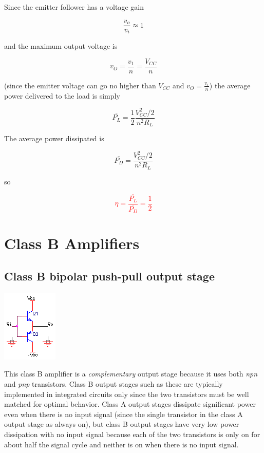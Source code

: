 Since the emitter follower has a voltage gain

\textcolor{red}{
\begin{equation}
\frac{v_o}{v_i} \approx 1
\end{equation}
}

and the maximum output voltage is

\begin{equation}
v_{O} = \frac{v_{1}}{n} = \frac{V_{CC}}{n}
\end{equation}

(since the emitter voltage can go no higher than $V_{CC}$ and $v_{O} = \frac{v_{1}}{n}$) the average power delivered to the load is simply

\begin{equation}
\overline{P_{L}} = \frac{1}{2}\frac{V_{CC}^{2}/2}{n^{2}R_{L}}
\end{equation}

The average power dissipated is

\begin{equation}
\overline{P_{D}} = \frac{V_{CC}^{2}/2}{n^{2}R_{L}}
\end{equation}

so \autocite[591]{microelectronics-neaman}

\textcolor{red}{
\begin{equation}
\eta = \frac{\overline{P_{L}}}{\overline{P_{D}}} = \frac{1}{2}
\end{equation}
}

\section{Class B Amplifiers}

\subsection{Class B bipolar push-pull output stage}
\begin{center}
	\includegraphics{schematics/classBoutput.PNG}
\end{center}
This class B amplifier is a \textit{complementary} output stage because it uses both \textit{npn} and \textit{pnp} transistors.
Class B output stages such as these are typically implemented in integrated circuits only since the two transistors must be well matched for optimal behavior.
Class A output stages dissipate significant power even when there is no input signal (since the single transistor in the class A output stage as always on), but class B output stages have very low power dissipation with no input signal because each of the two transistors is only on for about half the signal cycle and neither is on when there is no input signal.

